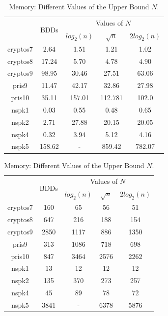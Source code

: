 \documentclass[11pt]{report}
\begin{document}
\begin{table}
\centering
\begin{tabular}{|*{5}{c|}}
\hline
& \multirow{2}{*}{BDDs} & \multicolumn{3}{c|}{Values of $N$}  \\ \cline{3-5}
&  & $log_2(n)$ & $\sqrt{n}$ & $2log_2(n)$  \\ \hline
cryptos7 & 2.64 &1.51 & 1.21 & 1.02 \\ \hline
cryptos8 & 17.24 & 5.70 & 4.78 & 4.90 \\ \hline
cryptos9 & 98.95 & 30.46& 27.51  & 63.06 \\ \hline
pris9 & 11.47 & 42.17 & 32.86 & 27.98  \\ \hline
pris10 & 35.11 & 157.01 & 112.781  & 102.0 \\ \hline
nspk1 & 0.03 & 0.55 & 0.48& 0.65 \\ \hline
nspk2 & 2.71 & 27.88 &20.15 & 20.05 \\ \hline
nspk4 & 0.32 & 3.94 & 5.12 & 4.16 \\ \hline
nspk5 & 158.62 & -& 859.42& 782.07 \\ \hline
\end{tabular}
\caption{Time Comparisons With Different Values of the Upper Bound $N$. In the table, $n$ denotes the total number of variables in the model.}
\label{table:upperboundvaluestime}
\vspace{1in}
\centering
\begin{tabular}{|*{5}{c|}}
\hline
 & \multirow{2}{*}{BDDs} & \multicolumn{3}{c|}{Values of $N$}  \\ \cline{3-5}
 & & $log_2(n)$ & $\sqrt{n}$ & $2log_2(n)$  \\ \hline
cryptos7 & 160 & 65 & 56  & 51 \\ \hline
cryptos8 & 647 & 216 & 188 & 154 \\ \hline
cryptos9 &2850& 1117 & 886  & 1350\\ \hline
pris9 & 313 &1086 & 718  & 698\\ \hline
pris10 & 847& 3464 & 2576 & 2262\\ \hline
nspk1 & 13 & 12 & 12  &  12\\ \hline
nspk2 & 135 & 370 & 273  & 257\\ \hline
nspk4 & 45 & 89&78  & 72 \\ \hline
nspk5 & 3841 & - & 6378 & 5876  \\ \hline
\end{tabular}
\caption{Memory: Different Values of the Upper Bound $N$. }
\label{table:upperboundvaluesmemory}
\end{table}
\end{document}
